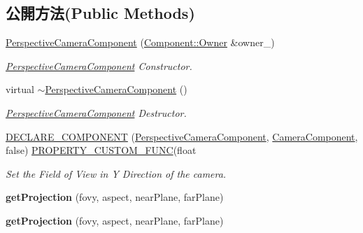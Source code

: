 \subsection*{公開方法(Public Methods)}
\begin{DoxyCompactItemize}
\item 
\hyperlink{class_magnum_1_1_perspective_camera_component_a63c001a1398786823ee01bdf7bf38cb9}{Perspective\+Camera\+Component} (\hyperlink{class_magnum_1_1_component_1_1_owner}{Component\+::\+Owner} \&owner\+\_\+)
\begin{DoxyCompactList}\small\item\em \hyperlink{class_magnum_1_1_perspective_camera_component}{Perspective\+Camera\+Component} Constructor. \end{DoxyCompactList}\item 
virtual \hyperlink{class_magnum_1_1_perspective_camera_component_a7fb684b3fb2c9e3e19ee017acac84327}{$\sim$\+Perspective\+Camera\+Component} ()
\begin{DoxyCompactList}\small\item\em \hyperlink{class_magnum_1_1_perspective_camera_component}{Perspective\+Camera\+Component} Destructor. \end{DoxyCompactList}\item 
\hyperlink{class_magnum_1_1_perspective_camera_component_a99142167f7e11bfad569261314c990d5}{D\+E\+C\+L\+A\+R\+E\+\_\+\+C\+O\+M\+P\+O\+N\+E\+NT} (\hyperlink{class_magnum_1_1_perspective_camera_component}{Perspective\+Camera\+Component}, \hyperlink{class_magnum_1_1_camera_component}{Camera\+Component}, false)   \hyperlink{class_magnum_1_1_perspective_camera_component_a917ebee85b2f26f9d368b91cab1901ee}{P\+R\+O\+P\+E\+R\+T\+Y\+\_\+\+C\+U\+S\+T\+O\+M\+\_\+\+F\+U\+NC}(float
\begin{DoxyCompactList}\small\item\em Set the Field of View in Y Direction of the camera. \end{DoxyCompactList}\item 
{\bfseries get\+Projection} (fovy, aspect, near\+Plane, far\+Plane)\hypertarget{class_magnum_1_1_perspective_camera_component_ae37fa307bc036ec43269fd58198889aa}{}\label{class_magnum_1_1_perspective_camera_component_ae37fa307bc036ec43269fd58198889aa}

\item 
{\bfseries get\+Projection} (fovy, aspect, near\+Plane, far\+Plane)\hypertarget{class_magnum_1_1_perspective_camera_component_ae37fa307bc036ec43269fd58198889aa}{}\label{class_magnum_1_1_perspective_camera_component_ae37fa307bc036ec43269fd58198889aa}


\end{DoxyCompactItemize}

